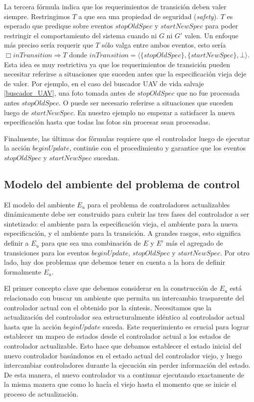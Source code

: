 La tercera fórmula indica que los requerimientos de transición deben valer siempre. Restringimos $T$ a que sea una
propiedad de seguridad (\emph{safety}). $T$ es esperado que predique sobre eventos $stopOldSpec$ y $startNewSpec$ para
poder restringir el comportamiento del sistema cuando ni $G$ ni $G'$ valen. Un enfoque más preciso sería requerir que
$T$ sólo valga entre ambos eventos, esto sería $\Box inTransition \Longrightarrow T$ donde $inTransition =
\langle\{stopOldSpec\},\{startNewSpec\}, \bot\rangle$. Esta idea es muy restrictiva ya que los requerimientos de transición
pueden necesitar referirse a situaciones que suceden antes que la especificación vieja deje de valer. Por ejemplo, en el
caso del buscador UAV de vida salvaje \ref{buscador_UAV}, una foto tomada antes de $stopOldSpec$ que no fue
procesada antes $stopOldSpec$. O puede ser necesario referirse a situaciones que suceden luego de $startNewSpec$. En
nuestro ejemplo no empezar a satisfacer la nueva especificación hasta que todas las fotos sin procesar sean procesadas.

Finalmente, las últimas dos fórmulas requiere que el controlador luego de ejecutar la acción $beginUpdate$, continúe con
el procedimiento y garantice que los eventos $stopOldSpec$ y $startNewSpec$ sucedan.

\subsection{Modelo del ambiente del problema de control}

El modelo del ambiente $E_u$ para el problema de controladores actualizables dinámicamente debe ser construido para cubrir las
tres fases del controlador a ser sintetizado: el ambiente para la especificación vieja, el ambiente para la nueva
especificación, y el ambiente para la transición. A grandes rasgos, esto significa definir a $E_u$ para que sea una
combinación de $E$ y $E'$ más el agregado de transiciones para los eventos $beginUpdate$, $stopOldSpec$ y
$startNewSpec$. Por otro lado, hay dos problemas que debemos tener en cuenta a la hora de definir formalmente $E_u$.

El primer concepto clave que debemos considerar en la construcción de $E_u$ está relacionado con buscar un ambiente que
permita un intercambio trasparente del controlador actual con el obtenido por la síntesis. Necesitamos que la actualización
del controlador sea estructuralmente idéntico al controlador actual hasta que la acción $beginUpdate$ suceda. Este
requerimiento es crucial para lograr establecer un mapeo de estados desde el controlador actual a los estados de controlador
actualizable. Esto hace que debamos establecer el estado inicial del nuevo controlador basándonos en el
estado actual del controlador viejo, y luego intercambiar controladores durante la ejecución sin perder información del
estado. De esta manera, el nuevo controlador va a continuar ejecutando exactamente de la misma manera que como lo hacía
el viejo hasta el momento que se inicie el proceso de actualización.

